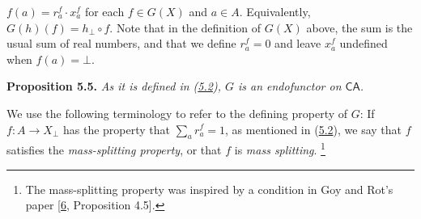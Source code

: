 \documentclass[11pt,a4paper]{amsart}
\begin{document}
\hypertarget{html:S5.SS0.SSS0.Px1.p2.m3}{}\({f(a)=r_{a}^{f}\cdot x_{a}^{f}}\) for each %
\hypertarget{html:S5.SS0.SSS0.Px1.p2.m4}{}\({f\in G(X)}\) and %
\hypertarget{html:S5.SS0.SSS0.Px1.p2.m5}{}\({a\in A}\). Equivalently, %
\hypertarget{html:S5.SS0.SSS0.Px1.p2.m6}{}\({G(h)(f)=h_{\bot}\circ f}\). Note that in the definition of %
\hypertarget{html:S5.SS0.SSS0.Px1.p2.m7}{}\({G(X)}\) above, the sum is the usual sum of real numbers, and that we define %
\hypertarget{html:S5.SS0.SSS0.Px1.p2.m8}{}\({r_{a}^{f}=0}\) and leave %
\hypertarget{html:S5.SS0.SSS0.Px1.p2.m9}{}\({x_{a}^{f}}\) undefined when %
\hypertarget{html:S5.SS0.SSS0.Px1.p2.m10}{}\({f(a)=\bot}\).
\par\medskip
\hypertarget{html:S5.Thmtheorem5}{} \par\noindent\textbf{\textbf{Proposition 5.5}\textbf{.}}\quad  %
\hypertarget{html:S5.Thmtheorem5.p1}{} \emph{As it is defined in (\hyperlink{html:S5.E2}{5.2}), %
\hypertarget{html:S5.Thmtheorem5.p1.m1}{}\({G}\) is an endofunctor on %
\hypertarget{html:S5.Thmtheorem5.p1.m2}{}\({\mathsf{CA}}\).}
\par\medskip
\hypertarget{html:S5.SS0.SSS0.Px1.p3}{} We use the following terminology to refer to the defining property of %
\hypertarget{html:S5.SS0.SSS0.Px1.p3.m1}{}\({G}\): If %
\hypertarget{html:S5.SS0.SSS0.Px1.p3.m2}{}\({f:A\to X_{\bot}}\) has the property that %
\hypertarget{html:S5.SS0.SSS0.Px1.p3.m3}{}\({\sum_{a}r_{a}^{f}=1}\), as mentioned in (\hyperlink{html:S5.E2}{5.2}), we say that %
\hypertarget{html:S5.SS0.SSS0.Px1.p3.m4}{}\({f}\) satisfies the \emph{mass-splitting property}, or that %
\hypertarget{html:S5.SS0.SSS0.Px1.p3.m5}{}\({f}\) is \emph{mass splitting}.%
\hypertarget{html:footnote1}{}\footnote{The mass-splitting property was inspired by a condition in Goy and Rot’s paper [\hyperlink{html:bib.bib6}{6}, Proposition 4.5].}
\par\medskip
\end{document}
